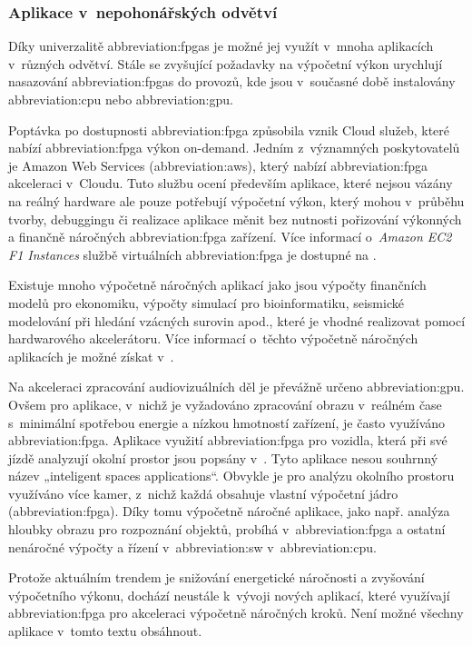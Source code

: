 \documentclass[a4paper, twoside, 11pt]{article}
\begin{document}
			\subsubsection{Aplikace v~nepohonářských odvětví}
				Díky univerzalitě \gls{abbreviation:fpgas} je možné jej využít v~mnoha aplikacích v~různých odvětví. Stále se zvyšující požadavky na výpočetní výkon urychlují nasazování \gls{abbreviation:fpgas} do provozů, kde jsou v~současné době instalovány \gls{abbreviation:cpu} nebo \gls{abbreviation:gpu}.\par
				Poptávka po dostupnosti \gls{abbreviation:fpga} způsobila vznik Cloud služeb, které nabízí \gls{abbreviation:fpga} výkon on-demand. Jedním z~významných poskytovatelů je Amazon Web Services (\gls{abbreviation:aws}), který nabízí \gls{abbreviation:fpga} akceleraci v~Cloudu. Tuto službu ocení především aplikace, které nejsou vázány na reálný hardware ale pouze potřebují výpočetní výkon, který mohou v~průběhu tvorby, debuggingu či realizace aplikace měnit bez nutnosti pořizování výkonných a finančně náročných \gls{abbreviation:fpga} zařízení. Více informací o~\textit{Amazon EC2 F1 Instances} službě virtuálních \gls{abbreviation:fpga} je dostupné na \cite{amazon-ec2-f1}.\par
				Existuje mnoho výpočetně náročných aplikací jako jsou výpočty finančních modelů pro ekonomiku, výpočty simulací pro bioinformatiku, seismické modelování při hledání vzácných surovin apod., které je vhodné realizovat pomocí hardwarového akcelerátoru. Více informací o~těchto výpočetně náročných aplikacích je možné získat v~\cite{wim-high-performance-computing-using-fpgas}.\par
				Na akceleraci zpracování audiovizuálních děl je převážně určeno \gls{abbreviation:gpu}. Ovšem pro aplikace, v~nichž je vyžadováno zpracování obrazu v~reálném čase s~minimální spotřebou energie a nízkou hmotností zařízení, je často využíváno \gls{abbreviation:fpga}. Aplikace využití \gls{abbreviation:fpga} pro vozidla, která při své jízdě analyzují okolní prostor jsou popsány v~\cite{andina-advanced-features-and-industrial-applications-of-fpga}. Tyto aplikace nesou souhrnný název „inteligent spaces applications“. Obvykle je pro analýzu okolního prostoru využíváno více kamer, z~nichž každá obsahuje vlastní výpočetní jádro (\gls{abbreviation:fpga}). Díky tomu výpočetně náročné aplikace, jako např. analýza hloubky obrazu pro rozpoznání objektů, probíhá v~\gls{abbreviation:fpga} a ostatní nenáročné výpočty a řízení v~\gls{abbreviation:sw} v~\gls{abbreviation:cpu}. \cite{andina-advanced-features-and-industrial-applications-of-fpga}\par
				Protože aktuálním trendem je snižování energetické náročnosti a zvyšování výpočetního výkonu, dochází neustále k~vývoji nových aplikací, které využívají \gls{abbreviation:fpga} pro akceleraci výpočetně náročných kroků. Není možné všechny aplikace v~tomto textu obsáhnout.
\end{document}
